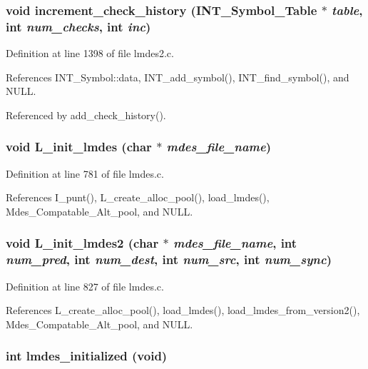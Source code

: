 \subsubsection{\setlength{\rightskip}{0pt plus 5cm}void increment\_\-check\_\-history (\bf{INT\_\-Symbol\_\-Table} $\ast$ {\em table}, int {\em num\_\-checks}, int {\em inc})}\label{lmdes_8h_29f817af40da58d6d2d8154a3d6f425f}




Definition at line 1398 of file lmdes2.c.

References INT\_\-Symbol::data, INT\_\-add\_\-symbol(), INT\_\-find\_\-symbol(), and NULL.

Referenced by add\_\-check\_\-history().
\subsubsection{\setlength{\rightskip}{0pt plus 5cm}void L\_\-init\_\-lmdes (char $\ast$ {\em mdes\_\-file\_\-name})}\label{lmdes_8h_8a5b297b5c6aff02e81706246fe2b37d}




Definition at line 781 of file lmdes.c.

References I\_\-punt(), L\_\-create\_\-alloc\_\-pool(), load\_\-lmdes(), Mdes\_\-Compatable\_\-Alt\_\-pool, and NULL.
\subsubsection{\setlength{\rightskip}{0pt plus 5cm}void L\_\-init\_\-lmdes2 (char $\ast$ {\em mdes\_\-file\_\-name}, int {\em num\_\-pred}, int {\em num\_\-dest}, int {\em num\_\-src}, int {\em num\_\-sync})}\label{lmdes_8h_31b24a9481d90385d7406c58673a53d1}




Definition at line 827 of file lmdes.c.

References L\_\-create\_\-alloc\_\-pool(), load\_\-lmdes(), load\_\-lmdes\_\-from\_\-version2(), Mdes\_\-Compatable\_\-Alt\_\-pool, and NULL.
\subsubsection{\setlength{\rightskip}{0pt plus 5cm}int lmdes\_\-initialized (void)}\label{lmdes_8h_8036561f663279103ef2f7065b02f1dd}




